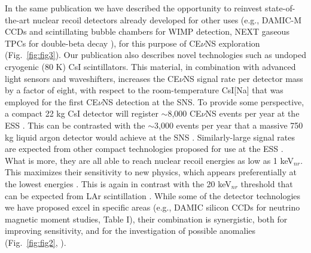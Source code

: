 \documentclass[12pt]{article}
\begin{document}
In the same publication we have described the opportunity to reinvest state-of-the-art nuclear recoil detectors already developed for other uses (e.g., DAMIC-M CCDs \cite{damic1,damic2,damic3,damic4} and scintillating bubble chambers \cite{eric} for WIMP detection, NEXT gaseous TPCs for double-beta decay \cite{next1,next2,next3}), for this purpose of CE$\nu$NS exploration (Fig.\ \ref{fig:fig3}). Our publication also describes novel technologies such as undoped cryogenic (80 K) CsI scintillators. This material, in combination with advanced light sensors and waveshifters, increases the CE$\nu$NS signal rate per detector mass by a factor of eight, with respect to the room-temperature CsI[Na] that was employed for the first CE$\nu$NS detection at the SNS. To provide some perspective, a compact 22 kg  CsI detector will register $\sim$8,000 CE$\nu$NS events per year at the ESS \cite{ESS}. This can be contrasted with the $\sim$3,000 events per year that a massive 750 kg liquid argon detector would achieve at the SNS \cite{tayloe}. Similarly-large signal rates are expected from other compact technologies proposed for use at the ESS \cite{ESS}. What is more, they are all able to reach nuclear recoil energies as low as 1 keV$_{nr}$. This maximizes their sensitivity to new physics, which appears preferentially at the lowest energies \cite{ESS}. This is again in contrast with the 20 keV$_{nr}$ threshold that can be expected from LAr scintillation \cite{tayloe,tayloe2}. While some of the detector technologies we have proposed excel in specific areas (e.g., DAMIC silicon CCDs for neutrino magnetic moment studies, Table I), their combination is synergistic, both for improving sensitivity, and for the investigation of possible anomalies (Fig.\ \ref{fig:fig2}, \cite{ESS}).   \\
\end{document}
